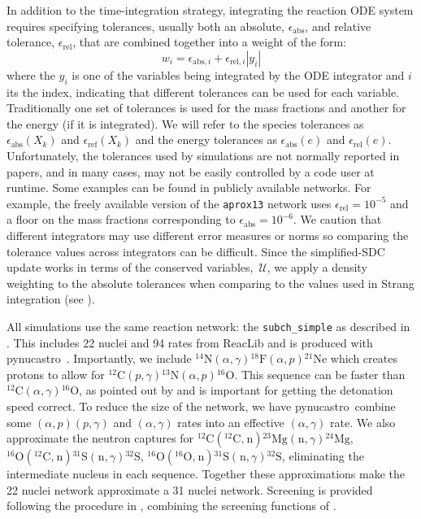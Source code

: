 \documentclass[preprint,linenumbers]{aastex631}
\newcommand{\isotm}[2]{{}^{#2}\mathrm{#1}}
\newcommand{\pynucastro}{{\sf pynucastro}}
\newcommand{\Uc}{{\,\bm{\mathcal{U}}}}
\begin{document}
In addition to the time-integration strategy, integrating the reaction
ODE system requires specifying tolerances, usually both an absolute, $\epsilon_\mathrm{abs}$, and relative tolerance, $\epsilon_\mathrm{rel}$, that are combined together into a weight of the form:
\begin{equation}
w_i = \epsilon_{\mathrm{abs},i} + \epsilon_{\mathrm{rel},i} |y_i|
\end{equation}
where the $y_i$ is one of the variables being integrated by the ODE
integrator and $i$ its the index, indicating that different tolerances
can be used for each variable.  Traditionally one set of tolerances is
used for the mass fractions and another for the energy (if it is
integrated).  We will refer to the species tolerances as $\epsilon_\mathrm{abs}(X_k)$ and $\epsilon_\mathrm{ref}(X_k)$ and the energy tolerances as $\epsilon_\mathrm{abs}(e)$ and $\epsilon_\mathrm{rel}(e)$.  Unfortunately, the tolerances used by simulations are
not normally reported in papers, and in many cases, may not be easily
controlled by a code user at runtime. Some examples can be found in publicly
available networks.  For example, the freely available version of the
{\tt aprox13} network uses $\epsilon_\mathrm{rel} = 10^{-5}$ and a
floor on the mass fractions corresponding to $\epsilon_\mathrm{abs} =
10^{-6}$.  We caution that different integrators
may use different error measures or norms so comparing the tolerance values across integrators can be difficult. 
 Since the simplified-SDC update works in terms of the
conserved variables, $\Uc$, we apply a density weighting to the absolute tolerances when comparing to the values used in Strang integration (see \citealt{castro_simple_sdc}).


All simulations use the same reaction network: the {\tt subch\_simple}
as described in \cite{zhi2023}.  This includes 22 nuclei and 94 rates
from ReacLib \citep{reaclib} and is produced with
\pynucastro\ \citep{pynucastro2}.  Importantly, we include
$\isotm{N}{14}(\alpha,\gamma)\isotm{F}{18}(\alpha,p)\isotm{Ne}{21}$
which creates protons to allow for
$\isotm{C}{12}(p,\gamma)\isotm{N}{13}(\alpha,p)\isotm{O}{16}$.  This
sequence can be faster than
$\isotm{C}{12}(\alpha,\gamma)\isotm{O}{16}$, as pointed out by
\citet{shenbildsten} and is important for getting the detonation speed
correct.  To reduce the size of the network, we have
\pynucastro\ combine some $(\alpha,p)(p,\gamma)$ and $(\alpha,\gamma)$
rates into an effective $(\alpha,\gamma)$ rate.  We also approximate
the neutron captures for $\isotm{C}{12}(\isotm{C}{12},\isotm{n}{})\isotm{Mg}{23}(\isotm{n}{},\gamma)\isotm{Mg}{24}$, $\isotm{O}{16}(\isotm{C}{12},\isotm{n}{})\isotm{S}{31}(\isotm{n}{},\gamma)\isotm{S}{32}$, $\isotm{O}{16}(\isotm{O}{16}, \isotm{n}{})\isotm{S}{31}(\isotm{n}{},\gamma)\isotm{S}{32}$, eliminating
the intermediate nucleus in each sequence.  Together these approximations make the 22 nuclei network approximate a 31 nuclei network.  Screening is provided
following the procedure in \citet{wallace:1982}, combining the
screening functions of \citet{graboske:1973,alastuey:1978,itoh:1979}.
\end{document}
